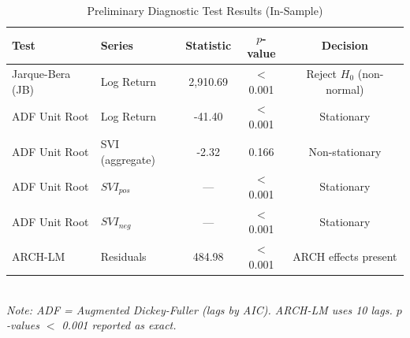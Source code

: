 \begin{table}[H]
\centering
\caption{Preliminary Diagnostic Test Results (In-Sample)}
\label{tab:diagnostics}
\small
\begin{tabular}{llccc}
\toprule
Test & Series & Statistic & $p$-value & Decision \\
\midrule
Jarque-Bera (JB)  & Log Return       & 2,910.69 & $<$0.001 & Reject $H_0$ (non-normal) \\
ADF Unit Root     & Log Return       & -41.40 & $<$0.001 & Stationary \\
ADF Unit Root     & SVI (aggregate)  & -2.32  & 0.166    & Non-stationary \\
ADF Unit Root     & $SVI_{pos}$      & ---      & $<$0.001 & Stationary \\
ADF Unit Root     & $SVI_{neg}$      & ---      & $<$0.001 & Stationary \\
ARCH-LM           & Residuals        & 484.98   & $<$0.001 & ARCH effects present \\
\bottomrule
\end{tabular}
\smallskip\\
\footnotesize\textit{Note: ADF = Augmented Dickey-Fuller (lags by AIC). ARCH-LM uses 10 lags. $p$-values $<$ 0.001 reported as exact.}
\end{table}